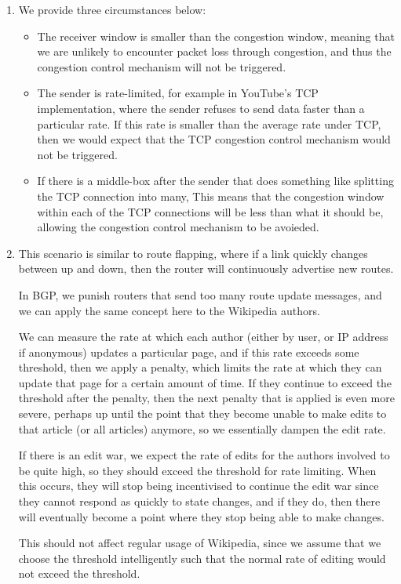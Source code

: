 


\begin{enumerate}[label=(\alph*)]
  \item
    We provide three circumstances below:

    \begin{itemize}
      \item
        The receiver window is smaller than the congestion window, meaning that we are unlikely to encounter packet loss through congestion, and thus the congestion control mechanism will not be triggered.

      \item
        The sender is rate-limited, for example in YouTube's TCP implementation, where the sender refuses to send data faster than a particular rate. If this rate is smaller than the average rate under TCP, then we would expect that the TCP congestion control mechanism would not be triggered.

      \item
        If there is a middle-box after the sender that does something like splitting the TCP connection into many, This means that the congestion window within each of the TCP connections will be less than what it should be, allowing the congestion control mechanism to be avoieded.
    \end{itemize}

  \item
    This scenario is similar to route flapping, where if a link quickly changes between up and down, then the router will continuously advertise new routes.

    In BGP, we punish routers that send too many route update messages, and we can apply the same concept here to the Wikipedia authors.

    We can measure the rate at which each author (either by user, or IP address if anonymous) updates a particular page, and if this rate exceeds some threshold, then we apply a penalty, which limits the rate at which they can update that page for a certain amount of time. If they continue to exceed the threshold after the penalty, then the next penalty that is applied is even more severe, perhaps up until the point that they become unable to make edits to that article (or all articles) anymore, so we essentially dampen the edit rate.

    If there is an edit war, we expect the rate of edits for the authors involved to be quite high, so they should exceed the threshold for rate limiting. When this occurs, they will stop being incentivised to continue the edit war since they cannot respond as quickly to state changes, and if they do, then there will eventually become a point where they stop being able to make changes.

    This should not affect regular usage of Wikipedia, since we assume that we choose the threshold intelligently such that the normal rate of editing would not exceed the threshold.
        
\end{enumerate}


